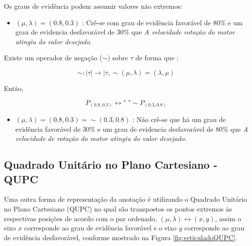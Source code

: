 Os graus de evidência podem assumir valores não extremos:

\begin{itemize}
\item 
$(\mu, \lambda ) = (0.8,0.3)$ : Crê-se com grau de evidência favorável de 80\% e um grau de evidencia desfavorável de 30\%  que \emph{A velocidade rotação do motor atingiu do valor desejado}.
\end{itemize}

Existe um operador de negação ($\sim $) sobre $\tau$ de forma que :
\begin{center}
\begin{equation}
\sim  : \mid \tau \mid \rightarrow \mid \tau , \sim(\mu, \lambda ) = (\lambda, \mu )
\end{equation}
\end{center}

Então,
\begin{center}
\begin{equation}
P_{(0.8,0.3)} \leftrightarrow \textrm{"   "} \sim P_{(0.3,0.8)}
\end{equation}
\end{center}

\begin{itemize}
\item 
$(\mu, \lambda ) = (0.8,0.3) = \sim (0.3,0.8)$ : Não crê-se que há um grau de evidência favorável de 30\% e um grau de evidencia desfavorável de 80\% que \emph{A velocidade de rotação do motor atingiu do valor desejado}.
\end{itemize}



\subsection{Quadrado Unitário no Plano Cartesiano - QUPC}

Uma outra forma de representação da anotação é utilizando o Quadrado Unitário no Plano Cartesiano (QUPC) no qual são transpostos os pontos extremos às respectivas posições de acordo com o par ordenado,  $(\mu, \lambda ) \leftrightarrow (x,y) $, assim o eixo $x$ corresponde ao grau de evidência favorável e o eixo $y$ corresponde ao grau de evidência desfavorável, conforme mostrado na Figura \ref{fig:reticuladoQUPC}.



